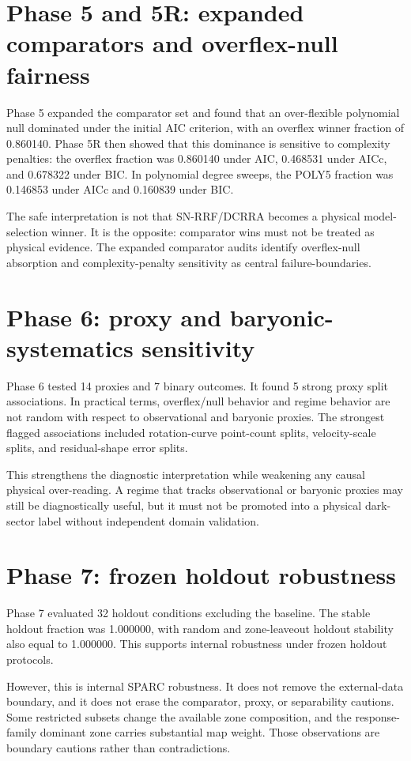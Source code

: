 \documentclass[11pt]{article}
\begin{document}
\section{Phase 5 and 5R: expanded comparators and overflex-null fairness}
Phase 5 expanded the comparator set and found that an over-flexible polynomial null dominated under the initial AIC criterion, with an overflex winner fraction of 0.860140. Phase 5R then showed that this dominance is sensitive to complexity penalties: the overflex fraction was 0.860140 under AIC, 0.468531 under AICc, and 0.678322 under BIC. In polynomial degree sweeps, the POLY5 fraction was 0.146853 under AICc and 0.160839 under BIC.

The safe interpretation is not that SN-RRF/DCRRA becomes a physical model-selection winner. It is the opposite: comparator wins must not be treated as physical evidence. The expanded comparator audits identify overflex-null absorption and complexity-penalty sensitivity as central failure-boundaries.

\section{Phase 6: proxy and baryonic-systematics sensitivity}
Phase 6 tested 14 proxies and 7 binary outcomes. It found 5 strong proxy split associations. In practical terms, overflex/null behavior and regime behavior are not random with respect to observational and baryonic proxies. The strongest flagged associations included rotation-curve point-count splits, velocity-scale splits, and residual-shape error splits.

This strengthens the diagnostic interpretation while weakening any causal physical over-reading. A regime that tracks observational or baryonic proxies may still be diagnostically useful, but it must not be promoted into a physical dark-sector label without independent domain validation.

\section{Phase 7: frozen holdout robustness}
Phase 7 evaluated 32 holdout conditions excluding the baseline. The stable holdout fraction was 1.000000, with random and zone-leaveout holdout stability also equal to 1.000000. This supports internal robustness under frozen holdout protocols.

However, this is internal SPARC robustness. It does not remove the external-data boundary, and it does not erase the comparator, proxy, or separability cautions. Some restricted subsets change the available zone composition, and the response-family dominant zone carries substantial map weight. Those observations are boundary cautions rather than contradictions.
\end{document}

